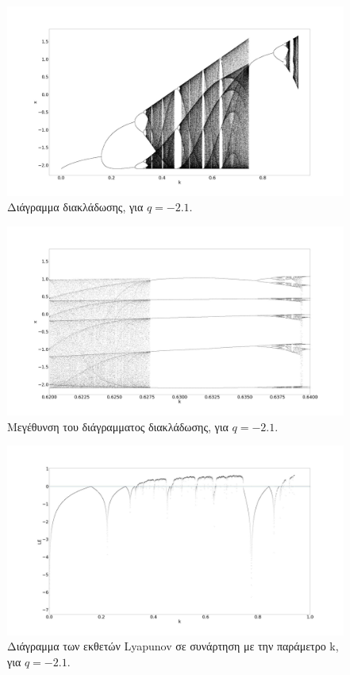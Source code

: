 \begin{figure}[ht]
	\centering
	\includegraphics[width=1\linewidth]{LateX images/graphs q21/g1}
	\caption{ Διάγραμμα διακλάδωσης, για $q=-2.1$.}
	\label{f:g41}
\end{figure}

\begin{figure}[ht]
	\centering
	\includegraphics[width=1\linewidth]{LateX images/graphs q21/g3}
	\caption{ Μεγέθυνση του διάγραμματος διακλάδωσης, για $q=-2.1$.}
	\label{f:g43}
\end{figure}


\begin{figure}[ht]
	\centering
	\includegraphics[width=1\linewidth]{LateX images/graphs q21/g2}
	\caption{Διάγραμμα των εκθετών Lyapunov σε συνάρτηση με την παράμετρο k, για $q=-2.1$.}
	\label{f:g42}
\end{figure}

